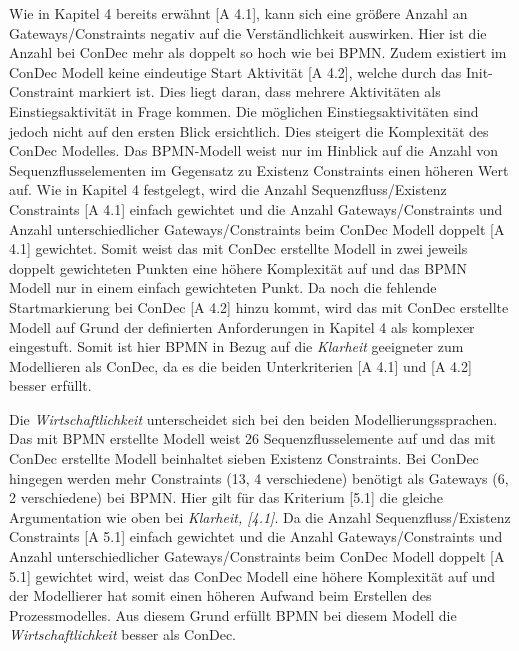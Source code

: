 Wie in Kapitel 4 bereits erwähnt [A 4.1], kann sich eine größere Anzahl an Gateways/Constraints negativ auf die Verständlichkeit auswirken. Hier ist die Anzahl bei ConDec mehr als doppelt so hoch wie bei BPMN. Zudem existiert im ConDec Modell keine eindeutige Start Aktivität [A 4.2], welche durch das Init-Constraint markiert ist. Dies liegt daran, dass mehrere Aktivitäten als Einstiegsaktivität in Frage kommen. Die möglichen Einstiegsaktivitäten sind jedoch nicht auf den ersten Blick ersichtlich. Dies steigert die Komplexität des ConDec Modelles. \newline
Das BPMN-Modell weist nur im Hinblick auf die Anzahl von Sequenzflusselementen im Gegensatz zu Existenz Constraints einen höheren Wert auf. Wie in Kapitel 4 festgelegt, wird die Anzahl Sequenzfluss/Existenz Constraints [A 4.1] einfach gewichtet und die Anzahl Gateways/Constraints und Anzahl unterschiedlicher Gateways/Constraints beim ConDec Modell doppelt [A 4.1] gewichtet. Somit weist das mit ConDec erstellte Modell in zwei jeweils doppelt gewichteten Punkten eine höhere Komplexität auf und das BPMN Modell nur in einem einfach gewichteten Punkt. Da noch die fehlende Startmarkierung bei ConDec [A 4.2] hinzu kommt, wird das mit ConDec erstellte Modell auf Grund der definierten Anforderungen in Kapitel 4 als komplexer eingestuft.
\newline
Somit ist hier BPMN in Bezug auf die \textit{Klarheit} geeigneter zum Modellieren als ConDec, da es die beiden Unterkriterien [A 4.1] und [A 4.2] besser erfüllt.\newline

Die \textit{Wirtschaftlichkeit} unterscheidet sich bei den beiden Modellierungssprachen. Das mit BPMN erstellte Modell weist 26 Sequenzflusselemente auf und das mit ConDec erstellte Modell beinhaltet sieben Existenz Constraints. Bei ConDec hingegen werden mehr Constraints (13, 4 verschiedene) benötigt als Gateways (6, 2 verschiedene) bei BPMN. Hier gilt für das Kriterium [5.1] die gleiche Argumentation wie oben bei \textit{Klarheit, [4.1]}. Da die Anzahl Sequenzfluss/Existenz Constraints [A 5.1] einfach gewichtet und die Anzahl Gateways/Constraints und Anzahl unterschiedlicher Gateways/Constraints beim ConDec Modell doppelt [A 5.1] gewichtet wird, weist das ConDec Modell eine höhere Komplexität auf und der Modellierer hat somit einen höheren Aufwand beim Erstellen des Prozessmodelles.\newline
Aus diesem Grund erfüllt BPMN bei diesem Modell die \textit{Wirtschaftlichkeit} besser als ConDec.\newline

